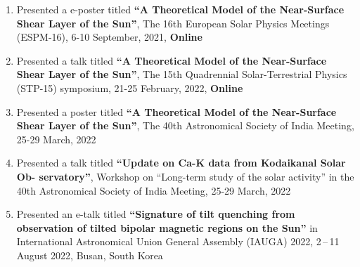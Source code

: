 \begin{enumerate}
    \item Presented a e-poster titled {\bf ``A Theoretical Model of the Near-Surface Shear Layer of the Sun''}, The 16th European Solar Physics Meetings (ESPM-16), 6-10 September, 2021, {\bf Online}
    
    \item Presented a talk titled {\bf ``A Theoretical Model of the Near-Surface Shear Layer of the Sun''}, The 15th Quadrennial Solar-Terrestrial Physics (STP-15) symposium, 21-25 February, 2022, {\bf Online}
    
    \item Presented a poster titled {\bf ``A Theoretical Model of the Near-Surface Shear Layer of the Sun''}, The 40th Astronomical Society of India Meeting, 25-29 March, 2022
    
    \item Presented a talk titled {\bf ``Update on Ca-K data from Kodaikanal Solar Ob- servatory''}, Workshop on “Long-term study of the solar activity” in the 40th Astronomical Society of India Meeting, 25-29 March, 2022
    
    \item Presented an e-talk titled {\bf ``Signature of tilt quenching from observation of tilted bipolar magnetic regions on the Sun''} in International Astronomical Union General Assembly (IAUGA) 2022, 2\,--\,11 August 2022, Busan, South Korea
    
\end{enumerate}
\clearpage